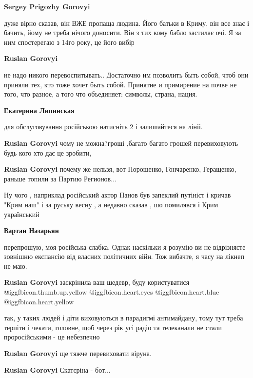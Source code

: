 \begin{itemize}
\begin{itemize}
\textbf{Sergey Prigozhy Gorovyi} 

дуже вірно сказав, він ВЖЕ пропаща людина. Його батьки в Криму, він все знає і
бачить, йому не треба нічого доносити. Він з тих кому бабло застилає очі. Я за
ним спостерегаю з 14го року, це його вибір

\textbf{Ruslan Gorovyi} 

не надо никого перевоспитывать.. Достаточно им позволить быть собой, чтоб они
приняли тех, кто тоже хочет быть собой. Принятие и примирение на почве не того,
что разное, а того что объединяет: символы, страна, нация.


\textbf{Екатерина Липинская} 

для обслуговування російською натисніть 2 і залишайтеся на лініі.

\textbf{Ruslan Gorovyi} чому не можна?гроші ,багато багато грошей перевиховують
будь кого хто дає це зробити,

\textbf{Ruslan Gorovyi} почему же нельзя, вот Порошенко, Гончаренко, Геращенко, раньше топили за Партию Регионов...


Ну чого , наприклад російський актор Панов був запеклий путініст і кричав "Крим
наш" і за руську весну , а недавно сказав , шо помилявся і Крим український



\textbf{Вартан Назарьян} 

перепрошую, моя російська слабка. Однак наскільки я розумію ви не відрізняєте
зовнішню експансію від власних політичних війн. Тож вибачте, я часу на лікнеп
не маю.

\textbf{Ruslan Gorovyi} заскрінила ваш шедевр, буду користуватися @igg{fbicon.thumb.up.yellow}  @igg{fbicon.heart.eyes}  @igg{fbicon.heart.blue}  @igg{fbicon.heart.yellow} 


так, у таких людей і діти виховуються в парадигмі антимайдану, тому тут треба
терпіти і чекати, головне, щоб через рік усі радіо та телеканали не стали
проросійськими - це небезпечно

\textbf{Ruslan Gorovyi} ще тяжче перевиховати віруна.

\textbf{Ruslan Gorovyi} Єкатєріна - бот...


\end{itemize}
\end{itemize}
